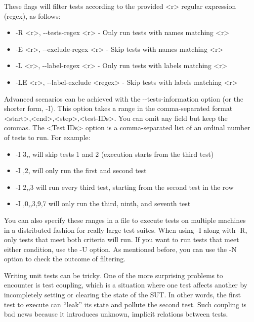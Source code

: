 These flags will filter tests according to the provided <r> regular expression (regex), as follows:

\begin{itemize}
\item
-R <r>, -{}-tests-regex <r> - Only run tests with names matching <r>

\item
-E <r>, -{}-exclude-regex <r> - Skip tests with names matching <r>

\item
-L <r>, -{}-label-regex <r> - Only run tests with labels matching <r>

\item
 -LE <r>, -{}-label-exclude <regex> - Skip tests with labels matching <r>
\end{itemize}

Advanced scenarios can be achieved with the -{}-tests-information option (or the shorter form, -I). This option takes a range in the comma-separated format <start>,<end>,<step>,<test-IDs>. You can omit any field but keep the commas. The <Test IDs> option is a comma-separated list of an ordinal number of tests to run. For example:

\begin{itemize}
\item
-I 3,, will skip tests 1 and 2 (execution starts from the third test)

\item
-I ,2, will only run the first and second test

\item
-I 2,,3 will run every third test, starting from the second test in the row

\item
-I ,0,,3,9,7 will only run the third, ninth, and seventh test
\end{itemize}

You can also specify these ranges in a file to execute tests on multiple machines in a distributed fashion for really large test suites. When using -I along with -R, only tests that meet both criteria will run. If you want to run tests that meet either condition, use the -U option. As mentioned before, you can use the -N option to check the outcome of filtering.


Writing unit tests can be tricky. One of the more surprising problems to encounter is test coupling, which is a situation where one test affects another by incompletely setting or clearing the state of the SUT. In other words, the first test to execute can “leak” its state and pollute the second test. Such coupling is bad news because it introduces unknown, implicit relations between tests.

